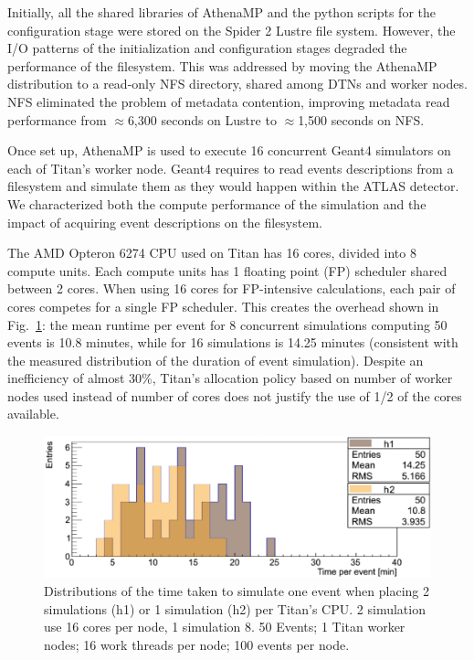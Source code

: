 Initially, all the shared libraries of AthenaMP and the python scripts for the
configuration stage were stored on the Spider 2 Lustre file system. However, the
I/O patterns of the initialization and configuration stages degraded the
performance of the filesystem. This was addressed by moving the AthenaMP
distribution to a read-only NFS directory, shared among DTNs and worker nodes.
NFS eliminated the problem of metadata contention, improving metadata read
performance from $\approx$6,300 seconds on Lustre to $\approx$1,500 seconds on
NFS.

Once set up, AthenaMP is used to execute 16 concurrent Geant4 simulators on each
of Titan's worker node. Geant4 requires to read events descriptions from a
filesystem and simulate them as they would happen within the ATLAS detector. We
characterized both the compute performance of the simulation and the impact of
acquiring event descriptions on the filesystem.

The AMD Opteron 6274 CPU used on Titan has 16 cores, divided into 8 compute
units. Each compute units has 1 floating point (FP) scheduler shared between 2
cores. When using 16 cores for FP-intensive calculations, each pair of cores
competes for a single FP scheduler. This creates the overhead shown in
Fig.~\ref{fig:comparison-8-16cores}: the mean runtime per event for 8
concurrent simulations computing 50 events is 10.8 minutes, while for 16
simulations is 14.25 minutes (consistent with the measured distribution of the
duration of event simulation). Despite an inefficiency of almost 30\%, Titan's
allocation policy based on number of worker nodes used instead of number of
cores does not justify the use of 1/2 of the cores available.

\begin{figure}[htp]
    \includegraphics[clip,width=\columnwidth]{figures/tx8_tx16_comparison_vsquashed.pdf}
   \vspace{-0.3in}
    \caption{Distributions of the time taken to simulate one event when placing
    2 simulations (h1) or 1 simulation (h2) per Titan's CPU. 2 simulation use 16
    cores per node, 1 simulation 8. 50 Events; 1 Titan worker nodes; 16 work
    threads per node; 100 events per node.}

\label{fig:comparison-8-16cores}
\end{figure}

